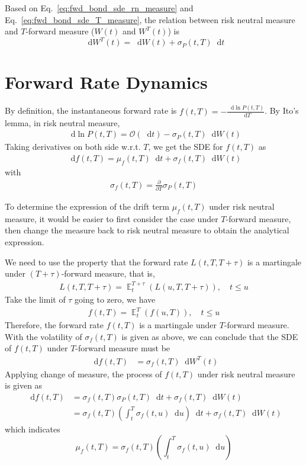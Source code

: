 \documentclass[12pt]{article}
\DeclareMathOperator{\E}{\mathbb{E}}
\newcommand{\dd}{\mathop{}\!\text{d}}
\newcommand{\qBrownian}[1]{W(#1)}
\newcommand{\tBrownian}[1]{W^{T}(#1)}
\newcommand{\sigmaP}{\sigma_P}
\newcommand{\sigmaf}{\sigma_f}
\begin{document}
Based on Eq.~\ref{eq:fwd_bond_sde_rn_measure} and Eq.~\ref{eq:fwd_bond_sde_T_measure},
the relation between risk neutral measure and $T$-forward measure
($\qBrownian{t}$ and $\tBrownian{t}$) is
\begin{equation}
    \label{eq:T_measure_relation}
    \dd \tBrownian{t} = \dd \qBrownian{t} + \sigmaP(t, T) \dd t
\end{equation}

\section{Forward Rate Dynamics}
By definition, the instantaneous forward rate is $f(t, T) = -\frac{\dd \ln P(t,T)}{\dd T}$.
By Ito's lemma, in risk neutral measure,
\begin{align}
    \dd \ln P(t, T) = \mathcal{O}(\dd t) - \sigmaP(t, T) \dd \qBrownian{t}
\end{align}
Taking derivatives on both side w.r.t. $T$, we get the SDE for $f(t, T)$ as
\begin{align}
    \dd f(t, T) = \mu_f(t, T) \dd t + \sigmaf(t, T) \dd \qBrownian{t}
\end{align}
with
\begin{align}
    \sigmaf(t, T) = \frac{\partial}{\partial T} \sigmaP(t, T)
\end{align}

To determine the expression of the drift term $\mu_f(t, T)$ under risk neutral measure,
it would be easier to first consider the case under $T$-forward measure, then change
the measure back to risk neutral measure to obtain the analytical expression.

We need to use the property that the forward rate $L(t, T, T+\tau)$ is a martingale
under $(T+\tau)$-forward measure, that is,
\begin{align}
    L(t, T, T+\tau) = \E_t^{T+\tau}\left(L(u, T,T+\tau)\right), \quad t \leq u
\end{align}
Take the limit of $\tau$ going to zero, we have
\begin{align}
    f(t, T) = \E_t^T \left(f(u, T)\right), \quad t \leq u
\end{align}
Therefore, the forward rate $f(t, T)$ is a martingale under $T$-forward measure.
With the volatility of $\sigmaf(t, T)$ is given as above, we can conclude that the SDE
of $f(t, T)$ under $T$-forward measure must be
\begin{align}
    \dd f(t,T) &= \sigmaf(t,T) \dd \tBrownian{t}
\end{align}
Applying change of measure, the process of $f(t, T)$ under risk neutral measure
is given as
\begin{align}
    \dd f(t,T) &= \sigmaf(t,T) \sigmaP(t, T) \dd t + \sigmaf(t,T)
        \dd \qBrownian{t} \\
        \label{eq:fwd_rate_sde}
        &= \sigmaf(t,T) \left(\int_t^T \sigmaf(t,u) \dd u \right) \dd t + \sigmaf(t,T)
        \dd \qBrownian{t}
\end{align}
which indicates
\begin{equation}
    \mu_f(t, T) = \sigmaf(t,T) \left(\int_t^T \sigmaf(t,u) \dd u \right) 
\end{equation}
 
\end{document}

